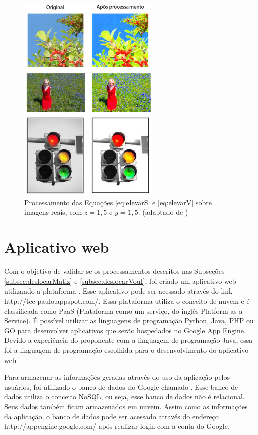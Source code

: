 \documentclass[	12pt, Times, openright, twoside, a4paper, english, brazil]{abntex2}
\begin{document}
\begin{figure}[!htb]
\centering \includegraphics[width=0.60\textwidth]{figuraRealSeV15.jpg}
\caption{Processamento das Equações \ref{eq:elevarS} e \ref{eq:elevarV} sobre imagens reais, com $z = 1,5$ e $y = 1,5$. (adaptado de ) \label{fig:figuraRealVeS}}
\end{figure}

\section{Aplicativo web}

Com o objetivo de validar se os processamentos descritos nas Subseções \ref{subsec:deslocarMatiz} e \ref{subsec:deslocarVouI}, foi criado um aplicativo web utilizando a plataforma . Esse aplicativo pode ser acessado através do link http://tcc-paulo.appspot.com/. Essa plataforma utiliza o conceito de nuvem e é classificada como PaaS (Plataforma como um serviço, do inglês Platform as a Service). É possível utilizar as linguagens de programação Python, Java, PHP ou GO para desenvolver aplicativos que serão hospedados no Google App Engine. Devido a experiência do proponente com a linguagem de programação Java, essa foi a linguagem de programação escolhida para o desenvolvimento do aplicativo web. 

Para armazenar as informações geradas através do uso da aplicação pelos usuários, foi utilizado o banco de dados do Google chamado . Esse banco de dados utiliza o conceito NoSQL, ou seja, esse banco de dados não é relacional. Seus dados também ficam armazenados em nuvem. Assim como as informações da aplicação, o banco de dados pode ser acessado através do endereço http://appengine.google.com/ após realizar login com a conta do Google.
\end{document}
